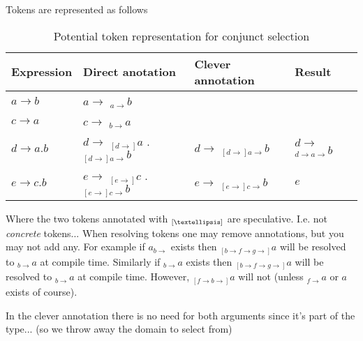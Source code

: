 \documentclass[11pt]{article}
\begin{document}
Tokens are represented as follows
\begin{table}[!ht]\centering
\begin{tabular}{|l|l|l|l|}
\hline
\textbf{Expression} & \textbf{Direct anotation}                                                    & \textbf{Clever annotation} & \textbf{Result} \\
\hline
$a \rightarrow b$   & $a \rightarrow $ $ _{a \rightarrow}b$                                        & & \\
$c \rightarrow a$   & $c \rightarrow $ $ _{b \rightarrow}a$                                        & & \\
$d \rightarrow a.b$ & $d \rightarrow $ $ _{[d \rightarrow]}a$ $.$ $_{[d \rightarrow] a \rightarrow}b$ & $d \rightarrow $ $_{[d \rightarrow] a \rightarrow}b$ & $d \rightarrow $ $_{d \rightarrow a \rightarrow}b$ \\
$e \rightarrow c.b$ & $e \rightarrow $ $ _{[e \rightarrow]}c$ $.$ $_{[e \rightarrow] c \rightarrow}b$ & $e \rightarrow $ $_{[e \rightarrow] c \rightarrow}b$ & $e$  \\
\hline
\end{tabular}
\caption{Potential token representation for conjunct selection}
\end{table}

Where the two tokens annotated with $_{[\textellipsis]}$ are speculative. I.e. not \emph{concrete} tokens...
When resolving tokens one may remove annotations, but you may not add any.
For example if $a_{b \rightarrow}$ exists then $_{[b \rightarrow f \rightarrow g \rightarrow]}a$ will be resolved to $_{b \rightarrow}a$ at compile time.
Similarly if $_{b \rightarrow}a$ exists then $_{[b \rightarrow f \rightarrow g \rightarrow]}a$ will be resolved to $_{b \rightarrow}a$ at compile time.
However, $_{[f \rightarrow b \rightarrow]}a$ will not (unless $_{f \rightarrow}a$ or $a$ exists of course).

In the clever annotation there is no need for both arguments since it's part of the type... (so we throw away the domain to select from)
\end{document}
